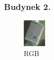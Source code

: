 \documentclass[a4paper,12pt]{article}  %
\begin{document}
\subsubsection{Budynek 2.}
\begin{figure}[H]
    \centering
    \begin{minipage}{0.24\textwidth}
        \centering
        \includegraphics[width=\linewidth]{spektralne/rgb_budynek0.png}
        \caption*{RGB}
    \end{minipage}
    \begin{minipage}{0.24\textwidth}
        \centering

\end{minipage}
\end{figure}
\end{document}
